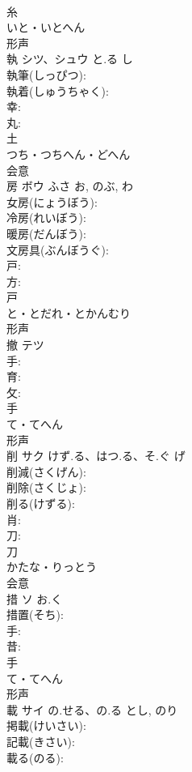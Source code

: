 \documentclass[8pt]{extreport}
\begin{document}
\begin{CJK}{UTF8}{min}
\\	糸	
\\	いと・いとへん	
\\	形声 
\\	執	シツ、シュウ	と.る	し	
\\	執筆(しっぴつ): 
\\	執着(しゅうちゃく): 
\\	幸: 
\\	丸: 
\\	土	
\\	つち・つちへん・どへん	
\\	会意 
\\	房	ボウ	ふさ	お, のぶ, わ	
\\	女房(にょうぼう): 
\\	冷房(れいぼう): 
\\	暖房(だんぼう): 
\\	文房具(ぶんぼうぐ): 
\\	戸: 
\\	方: 
\\	戸	
\\	と・とだれ・とかんむり	
\\	形声 
\\	撤	テツ			
\\	手: 
\\	育: 
\\	攵: 
\\	手	
\\	て・てへん	
\\	形声 
\\	削	サク	けず.る、はつ.る、そ.ぐ	げ	
\\	削減(さくげん): 
\\	削除(さくじょ): 
\\	削る(けずる): 
\\	肖: 
\\	刀: 
\\	刀	
\\	かたな・りっとう	
\\	会意 
\\	措	ソ	お.く		
\\	措置(そち): 
\\	手: 
\\	昔: 
\\	手	
\\	て・てへん	
\\	形声 
\\	載	サイ	の.せる、の.る	とし, のり	
\\	掲載(けいさい): 
\\	記載(きさい): 
\\	載る(のる): 

\end{CJK}
\end{document}
